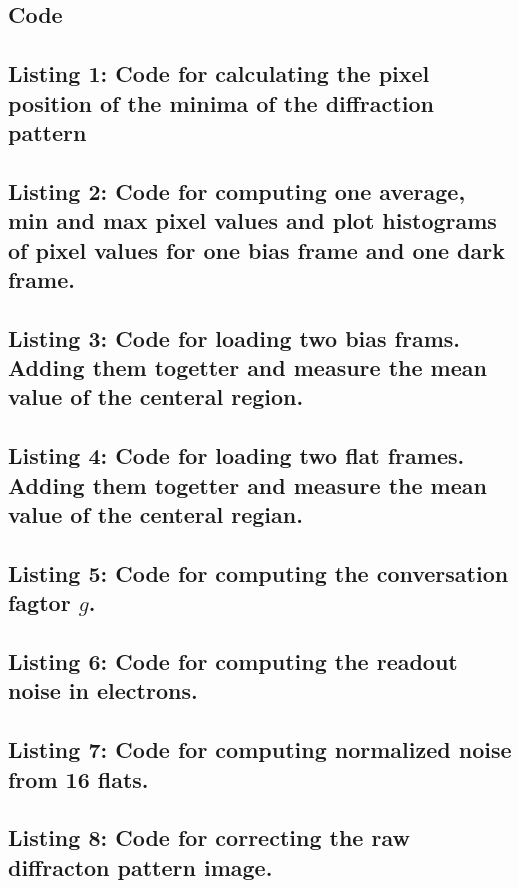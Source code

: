 \documentclass{emulateapj}
\begin{document}
\begin{appendix}

\section{Code}

\subsection{Listing 1: Code for calculating the pixel position of the minima of the diffraction pattern}


\subsection{Listing 2: Code for computing one average, min and max pixel values and plot histograms of pixel values for one bias frame and one dark frame.}


\subsection{Listing 3: Code for loading two bias frams. Adding them togetter and measure the mean value of the centeral region.}


\subsection{Listing 4: Code for loading two flat frames. Adding them togetter and measure the mean value of the centeral regian.}


\subsection{Listing 5: Code for computing the conversation fagtor $g$.}


\subsection{Listing 6: Code for computing the readout noise in electrons.}


\subsection{Listing 7: Code for computing normalized noise from 16 flats.}


\subsection{Listing 8: Code for correcting the raw diffracton pattern image.}


\end{appendix}
\end{document}
